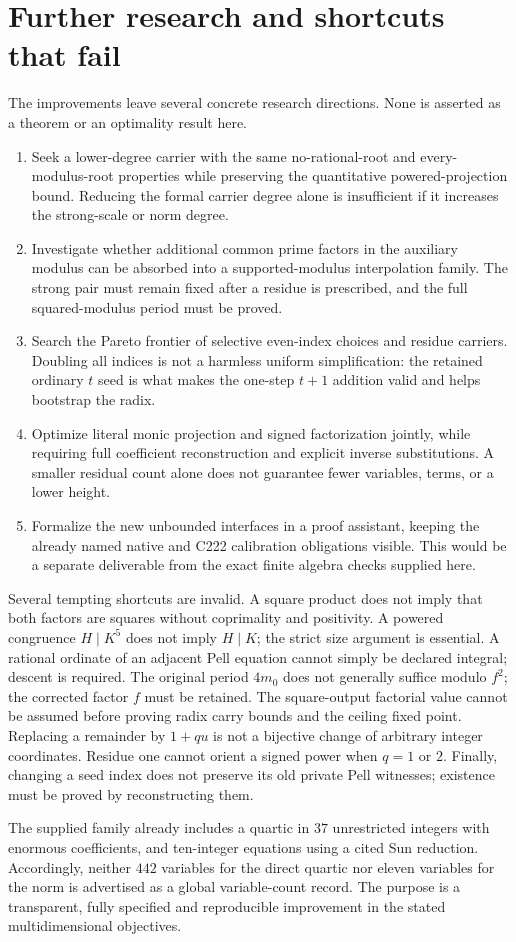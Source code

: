 \section{Further research and shortcuts that fail}
The improvements leave several concrete research directions. None is asserted as a theorem or an optimality result here.
\begin{enumerate}
\item Seek a lower-degree carrier with the same no-rational-root and every-modulus-root properties while preserving the quantitative powered-projection bound. Reducing the formal carrier degree alone is insufficient if it increases the strong-scale or norm degree.
\item Investigate whether additional common prime factors in the auxiliary modulus can be absorbed into a supported-modulus interpolation family. The strong pair must remain fixed after a residue is prescribed, and the full squared-modulus period must be proved.
\item Search the Pareto frontier of selective even-index choices and residue carriers. Doubling all indices is not a harmless uniform simplification: the retained ordinary $t$ seed is what makes the one-step $t+1$ addition valid and helps bootstrap the radix.
\item Optimize literal monic projection and signed factorization jointly, while requiring full coefficient reconstruction and explicit inverse substitutions. A smaller residual count alone does not guarantee fewer variables, terms, or a lower height.
\item Formalize the new unbounded interfaces in a proof assistant, keeping the already named native and C222 calibration obligations visible. This would be a separate deliverable from the exact finite algebra checks supplied here.
\end{enumerate}

Several tempting shortcuts are invalid. A square product does not imply that both factors are squares without coprimality and positivity. A powered congruence $H\mid K^5$ does not imply $H\mid K$; the strict size argument is essential. A rational ordinate of an adjacent Pell equation cannot simply be declared integral; descent is required. The original period $4m_0$ does not generally suffice modulo $f^2$; the corrected factor $f$ must be retained. The square-output factorial value cannot be assumed before proving radix carry bounds and the ceiling fixed point. Replacing a remainder by $1+qu$ is not a bijective change of arbitrary integer coordinates. Residue one cannot orient a signed power when $q=1$ or $2$. Finally, changing a seed index does not preserve its old private Pell witnesses; existence must be proved by reconstructing them.

The supplied family already includes a quartic in $37$ unrestricted integers with enormous coefficients, and ten-integer equations using a cited Sun reduction. Accordingly, neither $442$ variables for the direct quartic nor eleven variables for the norm is advertised as a global variable-count record. The purpose is a transparent, fully specified and reproducible improvement in the stated multidimensional objectives.
